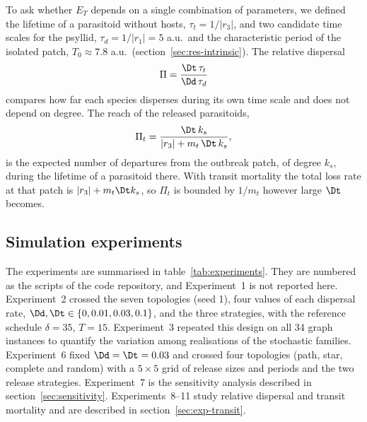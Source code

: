 To ask whether $E_T$ depends on a single combination of parameters, we defined the lifetime of a parasitoid without hosts, $\tau_t = 1/|r_3|$, and two candidate time scales for the psyllid, $\tau_d = 1/|r_1| = 5$ a.u.\ and the characteristic period of the isolated patch, $T_0 \approx 7.8$ a.u.\ (section~\ref{sec:res-intrinsic}). The relative dispersal
\begin{equation}
\Pi = \frac{\Dt\,\tau_t}{\Dd\,\tau_d}
\label{eq:Pi}
\end{equation}
compares how far each species disperses during its own time scale and does not depend on degree. The reach of the released parasitoids,
\begin{equation}
\Pi_t = \frac{\Dt\,k_s}{|r_3| + m_t\,\Dt\,k_s},
\label{eq:Pit}
\end{equation}
is the expected number of departures from the outbreak patch, of degree $k_s$, during the lifetime of a parasitoid there. With transit mortality the total loss rate at that patch is $|r_3| + m_t\Dt k_s$, so $\Pi_t$ is bounded by $1/m_t$ however large $\Dt$ becomes.

\subsection{Simulation experiments}
\label{sec:experiments}

The experiments are summarised in table~\ref{tab:experiments}. They are numbered as the scripts of the code repository, and Experiment~1 is not reported here. Experiment~2 crossed the seven topologies (seed 1), four values of each dispersal rate, $\Dd,\Dt\in\{0, 0.01, 0.03, 0.1\}$, and the three strategies, with the reference schedule $\delta = 35$, $T = 15$. Experiment~3 repeated this design on all 34 graph instances to quantify the variation among realisations of the stochastic families. Experiment~6 fixed $\Dd = \Dt = 0.03$ and crossed four topologies (path, star, complete and random) with a $5\times5$ grid of release sizes and periods and the two release strategies. Experiment~7 is the sensitivity analysis described in section~\ref{sec:sensitivity}. Experiments~8--11 study relative dispersal and transit mortality and are described in section~\ref{sec:exp-transit}.

